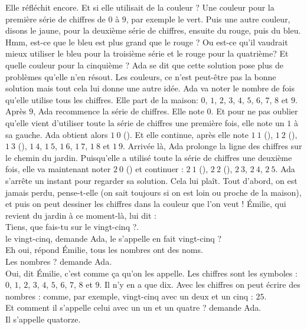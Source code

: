 Elle réfléchit encore. Et si elle utilisait de la couleur ? 
Une couleur pour la première série de chiffres de $0$ à $9$, par exemple le vert. Puis une autre couleur, disons le jaune, pour la deuxième série de chiffres, ensuite du rouge, puis du bleu. Hmm, est-ce que le bleu est plus grand que le rouge ? Ou est-ce qu’il vaudrait mieux utiliser le bleu pour la troisième série et le rouge pour la quatrième? Et quelle couleur pour la cinquième ? Ada se dit que cette solution pose plus de problèmes qu’elle n’en résout.  
Les couleurs, ce n’est peut-être pas la bonne solution mais tout cela lui donne une autre idée. Ada va noter le nombre de fois qu’elle utilise tous les chiffres. Elle part de la maison: $0$, $1$, $2$, $3$, $4$, $5$, $6$, $7$, $8$ et $9$. Après $9$, Ada recommence la série de chiffres. Elle note $0$. Et pour ne pas oublier qu’elle vient d’utiliser toute la série de chiffres une première fois, elle note un $1$ à sa gauche. Ada obtient alors $1~0$ (). Et elle continue, après elle note $1~1$ (), $1~2$ (), $1~3$ (), $1~4$, $1~5$, $1~6$, $1~7$, $1~8$ et $1~9$. 
Arrivée là, Ada prolonge la ligne des chiffres sur le chemin du jardin. 
Puisqu’elle a utilisé toute la série de chiffres une deuxième fois, elle va maintenant noter $2~0$ () et continuer : $2~1$ (), $2~2$ (), $2~3$, $2~4$, $2~5$. 
Ada s'arrête un instant pour regarder sa solution. Cela lui plaît. Tout d’abord, on est jamais perdu, pense-t-elle (on sait toujours si on est loin ou proche de la maison), et puis on peut dessiner les chiffres dans la couleur que l’on veut ! 
Émilie, qui revient du jardin à ce moment-là, lui dit :\\
\guillemotleft Tiens, que fais-tu sur le vingt-cinq ?. \\
\mdash le vingt-cinq, demande Ada, le  s’appelle en fait vingt-cinq ?\\
\mdash Eh oui, répond Émilie, tous les nombres ont des noms.\\
\mdash Les nombres ? demande Ada.\\
\mdash Oui, dit Émilie, c’est comme ça qu'on les appelle. Les chiffres sont les symboles : $0$, $1$, $2$, $3$, $4$, $5$, $6$, $7$, $8$ et $9$. Il n’y en a que dix. Avec les chiffres on peut écrire des nombres : comme, par exemple, vingt-cinq avec un deux et un cinq : $25$.\\
\mdash Et comment il s’appelle celui avec un un et un quatre ? demande Ada.\\
\mdash Il s'appelle quatorze.\\
